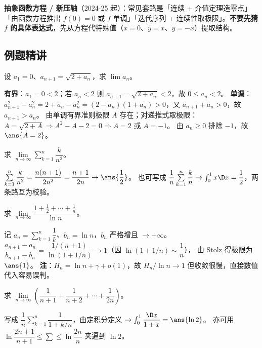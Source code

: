 \noindent\textbf{抽象函数方程 / 新压轴}（2024-25 起）：常见套路是「连续 + 介值定理造零点」「由函数方程推出 $f(0)=0$ 或 $f$ 单调」「迭代序列 + 连续性取极限」。\textbf{不要先猜 $f$ 的具体表达式}，先从方程代特殊值（$x=0$、$y=x$、$y=-x$）提取结构。

\subsection{例题精讲}

\begin{exa}[迭代：两件事都要证]
设 $a_1=0$、$a_{n+1}=\sqrt{2+a_n}$，求 $\lim a_n$。
\end{exa}
\begin{solution}
\textbf{有界}：$a_1=0<2$；若 $a_n<2$ 则 $a_{n+1}=\sqrt{2+a_n}<2$，故 $0\le a_n<2$。
\textbf{单调}：$a_{n+1}^2-a_n^2=2+a_n-a_n^2=(2-a_n)(1+a_n)>0$，又 $a_{n+1}+a_n>0$，故 $a_{n+1}>a_n$。
由单调有界准则极限 $A$ 存在；对递推式取极限：$A=\sqrt{2+A}\Rightarrow A^2-A-2=0\Rightarrow A=2$ 或 $A=-1$。
由 $a_n\ge0$ 排除 $-1$，故 $\ans{A=2}$。
\end{solution}

\begin{exa}[定积分定义 / 求和]
求 $\lim\limits_{n\to\infty}\sum\limits_{k=1}^n\dfrac{k}{n^2}$。
\end{exa}
\begin{solution}
$\sum\limits_{k=1}^n\dfrac{k}{n^2}=\dfrac{n(n+1)}{2n^2}=\dfrac{n+1}{2n}\to\ans{\dfrac12}$。
也可写成 $\dfrac1n\sum\limits_{k=1}^n\dfrac kn\to\int_0^1 x\D x=\dfrac12$，两条路互为校验。
\end{solution}

\begin{exa}[Stolz]
求 $\lim\limits_{n\to\infty}\dfrac{1+\frac12+\cdots+\frac1n}{\ln n}$。
\end{exa}
\begin{solution}
记 $a_n=\sum\limits_{k=1}^n\dfrac1k$、$b_n=\ln n$，$b_n$ 严格增且 $\to+\infty$。
$\dfrac{a_{n+1}-a_n}{b_{n+1}-b_n}=\dfrac{1/(n+1)}{\ln(1+1/n)}\to1$（因 $\ln(1+1/n)\sim\dfrac1n$），
由 Stolz 得极限为 $\ans{1}$。
\textbf{注}：$H_n=\ln n+\gamma+o(1)$，故 $H_n/\ln n\to1$ 但收敛很慢，直接数值代入容易误判。
\end{solution}

\begin{exa}[夹逼 / 调和和]
求 $\lim\limits_{n\to\infty}\left(\dfrac1{n+1}+\dfrac1{n+2}+\cdots+\dfrac1{2n}\right)$。
\end{exa}
\begin{solution}
写成 $\dfrac1n\sum\limits_{k=1}^n\dfrac{1}{1+k/n}$，由定积分定义
$\to\int_0^1\dfrac{\D x}{1+x}=\ans{\ln 2}$。
亦可用 $\ln\dfrac{2n+1}{n+1}\le\sum\le\ln\dfrac{2n}{n}$ 夹逼到 $\ln2$。
\end{solution}

